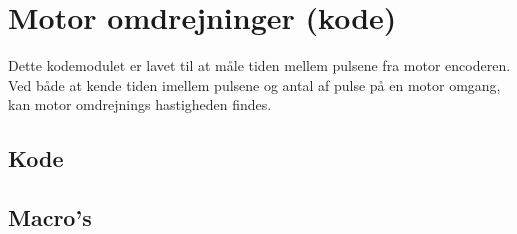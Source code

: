 \newpage

\section{Motor omdrejninger (kode)}
Dette kodemodulet er lavet til at måle tiden mellem pulsene fra motor encoderen. Ved både at kende tiden imellem pulsene og antal af pulse på en motor omgang, kan motor omdrejnings hastigheden findes.

\subsection{Kode}



\subsection{Macro's}